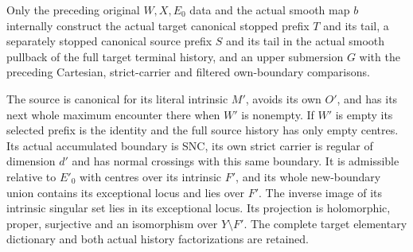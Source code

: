 \begin{theorem}
\label{hir:original-pure-boundary-independent-intrinsic-source}
\leanok
Only the preceding original $W,X,E_0$ data and the actual smooth map
$b$ internally construct the actual target canonical stopped prefix
$T$ and its tail, a separately stopped canonical source prefix $S$ and
its tail in the actual smooth pullback of the full target terminal
history, and an upper submersion $G$ with the preceding Cartesian,
strict-carrier and filtered own-boundary comparisons.

The source is canonical for its literal intrinsic $M'$, avoids its own
$O'$, and has its next whole maximum encounter there when $W'$ is
nonempty.  If $W'$ is empty its selected prefix is the identity and
the full source history has only empty centres.  Its actual accumulated
boundary is SNC, its own strict carrier is regular of dimension $d'$
and has normal crossings with this same boundary.  It is admissible
relative to $E'_0$ with centres over its intrinsic $F'$, and its whole
new-boundary union contains its exceptional locus and lies over $F'$.
The inverse image of its intrinsic singular set lies in its exceptional
locus.  Its projection is holomorphic, proper, surjective and an
isomorphism over $Y\setminus F'$.  The complete target elementary
dictionary and both actual history factorizations are retained.
\end{theorem}
